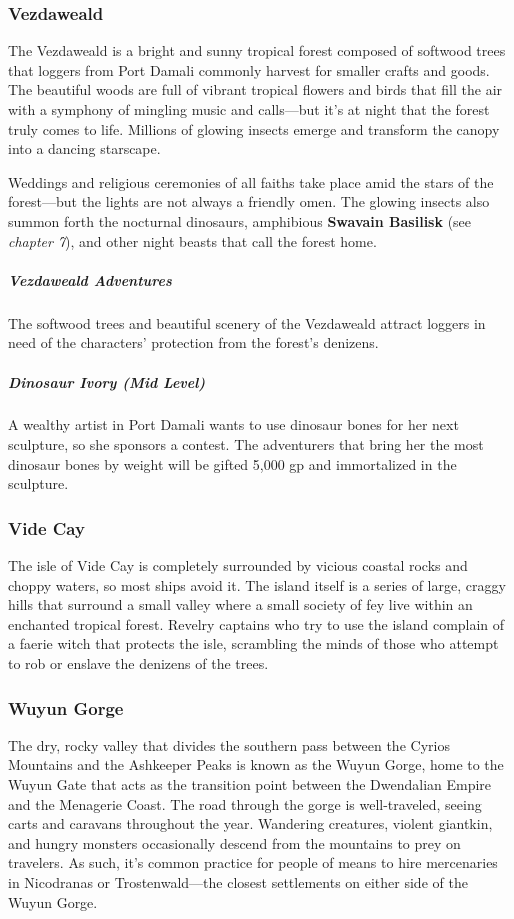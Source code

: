 \documentclass[10pt,a4paper,twoside,bg=print,twocolumn,openany,nodeprecatedcode]{dndbook}
\begin{document}
\subsubsection{Vezdaweald}
The Vezdaweald is a bright and sunny tropical forest composed of softwood trees that loggers from Port Damali commonly harvest for smaller crafts and goods. The beautiful woods are full of vibrant tropical flowers and birds that fill the air with a symphony of mingling music and calls—but it's at night that the forest truly comes to life. Millions of glowing insects emerge and transform the canopy into a dancing starscape.

Weddings and religious ceremonies of all faiths take place amid the stars of the forest—but the lights are not always a friendly omen. The glowing insects also summon forth the nocturnal dinosaurs, amphibious \textbf{Swavain Basilisk} (see \textit{chapter 7}), and other night beasts that call the forest home.

\subparagraph{Vezdaweald Adventures}
The softwood trees and beautiful scenery of the Vezdaweald attract loggers in need of the characters' protection from the forest's denizens.

\subparagraph{Dinosaur Ivory (Mid Level)}
A wealthy artist in Port Damali wants to use dinosaur bones for her next sculpture, so she sponsors a contest. The adventurers that bring her the most dinosaur bones by weight will be gifted 5,000 gp and immortalized in the sculpture.

\subsubsection{Vide Cay}
The isle of Vide Cay is completely surrounded by vicious coastal rocks and choppy waters, so most ships avoid it. The island itself is a series of large, craggy hills that surround a small valley where a small society of fey live within an enchanted tropical forest. Revelry captains who try to use the island complain of a faerie witch that protects the isle, scrambling the minds of those who attempt to rob or enslave the denizens of the trees.

\subsubsection{Wuyun Gorge}
The dry, rocky valley that divides the southern pass between the Cyrios Mountains and the Ashkeeper Peaks is known as the Wuyun Gorge, home to the Wuyun Gate that acts as the transition point between the Dwendalian Empire and the Menagerie Coast. The road through the gorge is well-traveled, seeing carts and caravans throughout the year. Wandering creatures, violent giantkin, and hungry monsters occasionally descend from the mountains to prey on travelers. As such, it's common practice for people of means to hire mercenaries in Nicodranas or Trostenwald—the closest settlements on either side of the Wuyun Gorge.
\end{document}
